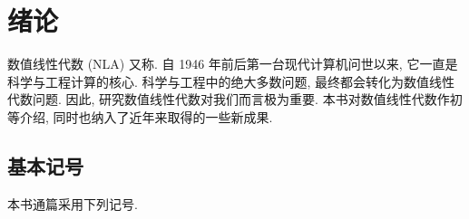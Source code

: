 \chapter{绪论}
\label{ch:introduction}

数值线性代数 (NLA) 又称. 自 1946 年前后第一台现代计算机问世以来, 它一直是科学与工程计算的核心. 科学与工程中的绝大多数问题, 最终都会转化为数值线性代数问题. 因此, 研究数值线性代数对我们而言极为重要. 本书对数值线性代数作初等介绍, 同时也纳入了近年来取得的一些新成果.

\section{基本记号}
\label{sec:ch1-basicsymbols}

本书通篇采用下列记号.

